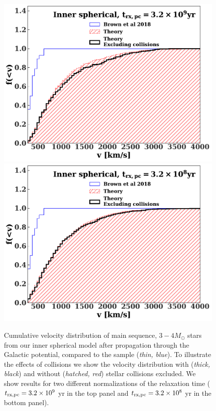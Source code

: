 \documentclass[fleqn,usenatbib]{mnras}
\begin{document}
\begin{figure}
    \includegraphics[width=\columnwidth]{figures/vcomp_binary_runs_1_acut_corr_tmin0.0.pdf}
    \includegraphics[width=\columnwidth]{figures/vcomp_binary_runs_2_acut_corr_tmin0.0.pdf}
    \caption{Cumulative velocity distribution of main sequence, $3-4 M_{\odot}$ stars from our inner spherical model after propagation through the Galactic potential, compared to the \citet{warren_brown+2018}  sample (\emph{thin, blue}). To illustrate the effects of collisions we show the velocity distribution with (\emph{thick, black}) and without (\emph{hatched, red}) stellar collisions excluded.
    We show results for two different normalizations of the relaxation time ($t_{\rm rx,pc}=3.2\times 10^9$ yr in the top panel and $t_{\rm rx, pc}=3.2\times 10^8$ yr in the bottom panel). }
    \label{fig:vdist}
\end{figure}
\end{document}
